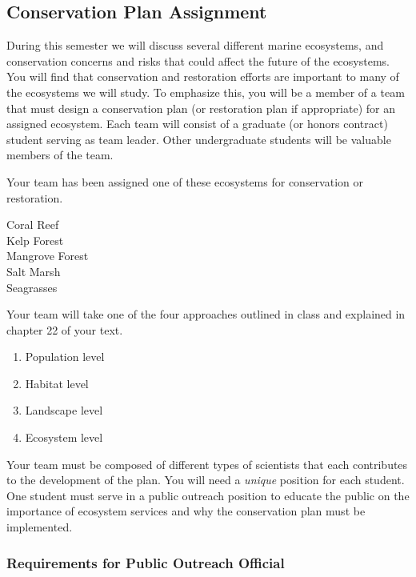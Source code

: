 \documentclass[12pt, hidelinks]{exam}
\begin{document}
\subsection*{Conservation Plan Assignment}

During this semester we will discuss several different marine 
ecosystems, and conservation concerns and risks that could 
affect the future of the ecosystems. You will find that
conservation and restoration efforts are important to many of the
ecosystems we will study. To emphasize this, you will be a member of a team
that must design a conservation plan (or restoration plan if appropriate) for an assigned ecosystem.
Each team will consist of a graduate (or honors contract) student serving as team leader. Other undergraduate students will be valuable members of the team.

Your team has been assigned one of these ecosystems for conservation or restoration.

\begin{multicols}{2}

Coral Reef\\ 
Kelp Forest\\ 
Mangrove Forest\\
Salt Marsh\\
Seagrasses

\end{multicols}

Your team will take one of the four approaches outlined in class and explained in chapter 22 of your text.

\begin{multicols}{2}
\begin{enumerate}
\def\labelenumi{\arabic{enumi}.}
\item
  Population level
\item
  Habitat level
\item
  Landscape level
\item
  Ecosystem level
\end{enumerate}
\end{multicols}

Your team must be composed of different types of scientists that each contributes
to the development of the plan. You will need a \emph{unique} position for each student. One student must serve in a public outreach position to educate the public on the importance of ecosystem services and why the conservation plan must be implemented. 

\subsubsection*{Requirements for Public Outreach Official}
\end{document}
